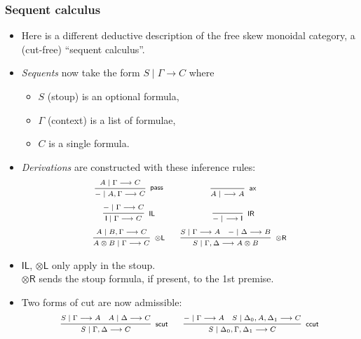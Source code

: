 \documentclass[10pt,t]{beamer}
\newcommand{\I}{\mathsf{I}}
\newcommand{\ot}{\otimes}
\newcommand{\n}{{-}}
\newcommand{\ax}{\mathsf{ax}}
\newcommand{\uf}{\mathsf{pass}}
\newcommand{\IL}{\I\mathsf{L}}
\newcommand{\otL}{\ot\mathsf{L}}
\newcommand{\IR}{\I\mathsf{R}}
\newcommand{\otR}{\ot\mathsf{R}}
\newcommand{\scut}{\mathsf{scut}}
\newcommand{\ccut}{\mathsf{ccut}}
\renewcommand{\vdash}{\longrightarrow}
\begin{document}
\begin{frame}

\frametitle{Sequent calculus}

\begin{itemize}

\item Here is a different deductive description of the free skew
  monoidal category, a (cut-free) ``sequent calculus''.

\item \emph{Sequents} now take the form $S \mid \Gamma \vdash C$
  where
\begin{itemize}
\item $S$ (stoup) is an optional formula,
\item $\Gamma$ (context) is a list of formulae,
\item $C$ is a single formula.
\end{itemize}

\item \emph{Derivations} are constructed with these inference rules:
\[
\scriptsize
\begin{array}{c@{\quad \quad}c}
\infer[\uf]{\n \mid A, \Gamma \vdash C}{
  A \mid \Gamma \vdash C
}
&
\infer[\ax]{A \mid ~\vdash A}{
}
\\[6pt]
\infer[\IL]{\I \mid \Gamma \vdash C}{
  \n \mid \Gamma \vdash C
}
&
\infer[\IR]{\n \mid ~ \vdash \I}{
}
\\[6pt]
\infer[\otL]{A \ot B \mid \Gamma \vdash C}{
  A \mid B, \Gamma \vdash C
}
&
\infer[\otR]{S \mid \Gamma, \Delta \vdash A \otimes B}{
  S \mid \Gamma \vdash A
  &
  \n \mid \Delta \vdash B
}
\end{array}
\]

\item $\IL$, $\otL$ only apply in the stoup. \\ 
 $\otR$ sends the stoup formula, if present, to the
  1st premise.

\item Two forms of cut are now admissible:
\[
\scriptsize
\infer[\scut]{S \mid \Gamma, \Delta \vdash C}{
  S \mid \Gamma \vdash A
  &
  A \mid \Delta \vdash C
}
\qquad
\infer[\ccut]{S \mid \Delta_0, \Gamma, \Delta_1 \vdash C}{
  \n \mid \Gamma \vdash A
  &
  S \mid \Delta_0, A, \Delta_1 \vdash C
}
\]
\end{itemize}


\end{frame}

\end{document}
